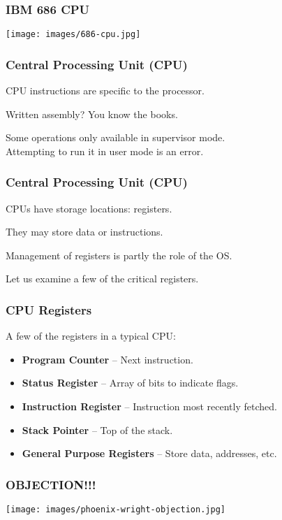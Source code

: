\begin{frame}
	\frametitle{IBM 686 CPU}

	\begin{center}
		\texttt{[image: images/686-cpu.jpg]}
	\end{center}

\end{frame}


\begin{frame}
	\frametitle{Central Processing Unit (CPU)}
	CPU instructions are specific to the processor.

	Written assembly? You know the books.

	Some operations only available in supervisor mode.\\
	\quad Attempting to run it in user mode is an error.


\end{frame}

\begin{frame}
	\frametitle{Central Processing Unit (CPU)}
	CPUs have storage locations: \alert{registers}.

	They may store data or instructions.

	Management of registers is partly the role of the OS.

	Let us examine a few of the critical registers.

\end{frame}

\begin{frame}
	\frametitle{CPU Registers}

	A few of the registers in a typical CPU:

	\begin{itemize}
		\item \textbf{Program Counter} -- Next instruction.
		\item \textbf{Status Register} -- Array of bits to indicate flags.
		\item \textbf{Instruction Register} -- Instruction most recently fetched.
		\item \textbf{Stack Pointer} -- Top of the stack.
		\item \textbf{General Purpose Registers} -- Store data, addresses, etc.
	\end{itemize}


\end{frame}


\begin{frame}
	\frametitle{OBJECTION!!!}

	\begin{center}
		\texttt{[image: images/phoenix-wright-objection.jpg]}
	\end{center}


\end{frame}


